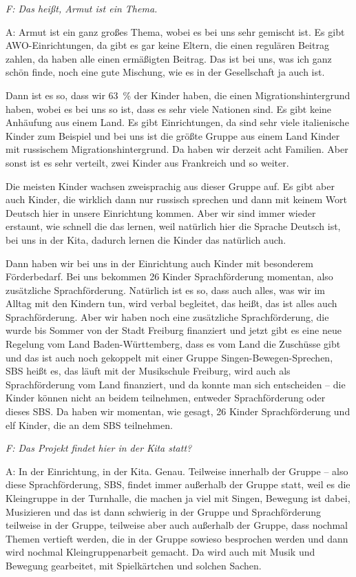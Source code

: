 \begin{linenumbers*}
\emph{F: Das heißt, Armut ist ein Thema.} 

A: Armut ist ein ganz großes Thema, wobei es bei uns sehr gemischt ist. Es gibt AWO-Einrichtungen, da gibt es gar keine Eltern, die einen regulären Beitrag zahlen, da haben alle einen ermäßigten Beitrag. Das ist bei uns, was ich ganz schön finde, noch eine gute Mischung, wie es in der Gesellschaft ja auch ist. 

Dann ist es so, dass wir 63~\% der Kinder haben, die einen Migrationshintergrund haben, wobei es bei uns so ist, dass es sehr viele Nationen sind. Es gibt keine Anhäufung aus einem Land. Es gibt Einrichtungen, da sind sehr viele italienische Kinder zum Beispiel und bei uns ist die größte Gruppe aus einem Land Kinder mit russischem Migrationshintergrund. Da haben wir derzeit acht Familien. Aber sonst ist es sehr verteilt, zwei Kinder aus Frankreich und so weiter. 

Die meisten Kinder wachsen zweisprachig aus dieser Gruppe auf. Es gibt aber auch Kinder, die wirklich dann nur russisch sprechen und dann mit keinem Wort Deutsch hier in unsere Einrichtung kommen. Aber wir sind immer wieder erstaunt, wie schnell die das lernen, weil natürlich hier die Sprache Deutsch ist, bei uns in der Kita, dadurch lernen die Kinder das natürlich auch. 

Dann haben wir bei uns in der Einrichtung auch Kinder mit besonderem Förderbedarf. Bei uns bekommen 26 Kinder Sprachförderung momentan, also zusätzliche Sprachförderung. Natürlich ist es so, dass auch alles, was wir im Alltag mit den Kindern tun, wird verbal begleitet, das heißt, das ist alles auch Sprachförderung. Aber wir haben noch eine zusätzliche Sprachförderung, die wurde bis Sommer von der Stadt Freiburg finanziert und jetzt gibt es eine neue Regelung vom Land Baden-Württemberg, dass es vom Land die Zuschüsse gibt und das ist auch noch gekoppelt mit einer Gruppe Singen-Bewegen-Sprechen, SBS heißt es, das läuft mit der Musikschule Freiburg, wird auch als Sprachförderung vom Land finanziert, und da konnte man sich entscheiden -- die Kinder können nicht an beidem teilnehmen, entweder Sprachförderung oder dieses SBS. Da haben wir momentan, wie gesagt, 26 Kinder Sprachförderung und elf Kinder, die an dem SBS teilnehmen.  

\emph{F: Das Projekt findet hier in der Kita statt?} 

A: In der Einrichtung, in der Kita. Genau. Teilweise innerhalb der Gruppe – also diese Sprachförderung, SBS, findet immer außerhalb der Gruppe statt, weil es die Kleingruppe in der Turnhalle, die machen ja viel mit Singen, Bewegung ist dabei, Musizieren und das ist dann schwierig in der Gruppe und Sprachförderung teilweise in der Gruppe, teilweise aber auch außerhalb der Gruppe, dass nochmal Themen vertieft werden, die in der Gruppe sowieso besprochen werden und dann wird nochmal Kleingruppenarbeit gemacht. Da wird auch mit Musik und Bewegung gearbeitet, mit Spielkärtchen und solchen Sachen. 


\end{linenumbers*}
